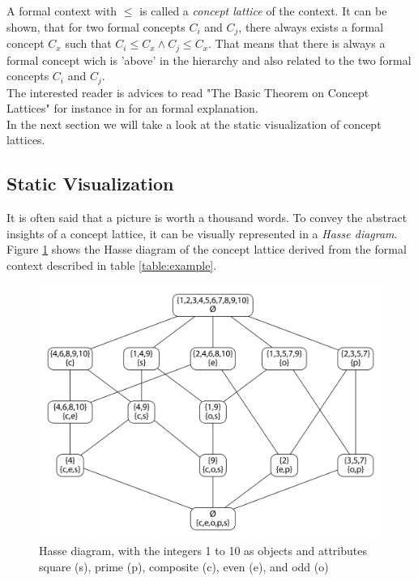 \documentclass[11pt]{report}
\begin{document}
{{A formal context with $\le$ is called a \textit{concept lattice} of the context. It can be shown, that for two formal concepts $C_i$ and $C_j$, there always exists a formal concept $C_x$ such that $C_i \le C_x \wedge C_j \le C_x$. That means that there is always a formal concept wich is 'above' in the hierarchy and also related to the two formal concepts $C_i$ and $C_j$. \\ 

The interested reader is advices to read "The Basic Theorem on Concept Lattices" for instance in \cite{carpineto2004concept} for an formal explanation. \\

In the next section we will take a look at the static visualization of concept lattices.

\subsection{Static Visualization}

It is often said that a picture is worth a thousand words. To convey the abstract insights of a concept lattice, it can be visually represented in a \textit{Hasse diagram}. Figure \ref{figure:example} shows the Hasse diagram of the concept lattice derived from the formal context described in table \ref{table:example}. \\

\begin{figure}[!ht]
	\centering
	\includegraphics[width=\linewidth]{./images/fcaExample}
\caption{Hasse diagram, with the integers 1 to 10 as objects and attributes square (s), prime (p), composite (c), even (e), and odd (o)}
\label{figure:example}
\end{figure}

}}
\end{document}
